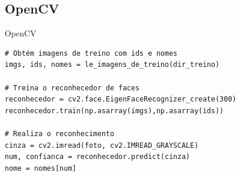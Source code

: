\subsection{OpenCV}

\begin{frame}[fragile]{OpenCV}
\begin{verbatim}
# Obtém imagens de treino com ids e nomes
imgs, ids, nomes = le_imagens_de_treino(dir_treino)

# Treina o reconhecedor de faces
reconhecedor = cv2.face.EigenFaceRecognizer_create(300)
reconhecedor.train(np.asarray(imgs),np.asarray(ids))

# Realiza o reconhecimento
cinza = cv2.imread(foto, cv2.IMREAD_GRAYSCALE)
num, confianca = reconhecedor.predict(cinza)
nome = nomes[num]
\end{verbatim}
\end{frame}



